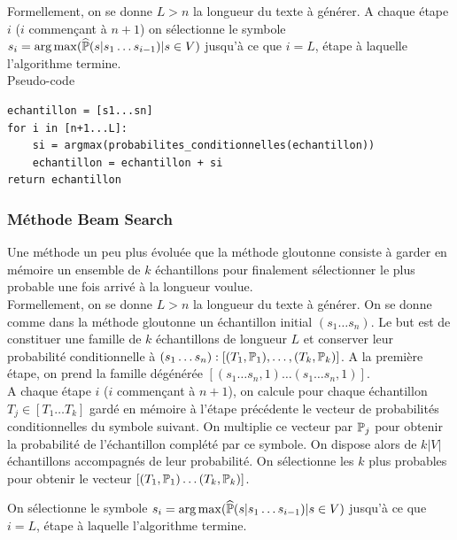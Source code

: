 Formellement, on se donne $L>n$ la longueur du texte à générer.
A chaque étape $i$ ($i$ commençant à $n+1$) on sélectionne le symbole
$s_i = \arg\max({\widehat{\P}(s|s_1\ldots s_{i-1}) | s \in V})$ jusqu'à ce que $i=L$,
étape à laquelle l'algorithme termine. \\

\noindent{} Pseudo-code

\begin{verbatim}
echantillon = [s1...sn]
for i in [n+1...L]:
    si = argmax(probabilites_conditionnelles(echantillon))
    echantillon = echantillon + si
return echantillon
\end{verbatim}


\subsubsection{Méthode Beam Search}
Une méthode un peu plus évoluée que la méthode gloutonne consiste à garder en mémoire un ensemble de $k$ échantillons pour finalement sélectionner le plus probable une fois arrivé à la longueur voulue. \\

Formellement, on se donne $L>n$ la longueur du texte à générer.
On se donne comme dans la méthode gloutonne un échantillon initial $(s_1\ldots s_n)$.
Le but est de constituer une famille de $k$ échantillons de longueur $L$ et conserver leur probabilité conditionnelle à $(s_1\ldots s_n) : [(T_1,\P_1),\ldots,(T_k,\P_k)]$.
A la première étape, on prend la famille dégénérée $[(s_1\ldots s_n, 1)\ldots (s_1\ldots s_n, 1)]$. \\

A chaque étape $i$ ($i$ commençant à $n+1$), on calcule pour chaque échantillon $T_j \in [T_1\ldots T_k]$ gardé en mémoire à l'étape précédente le vecteur de probabilités conditionnelles du symbole suivant. On multiplie ce vecteur par $\P_j$ pour obtenir la probabilité de l'échantillon complété par ce symbole.
On dispose alors de $k\vert V \vert$ échantillons accompagnés de leur probabilité. On sélectionne les $k$ plus probables pour obtenir le vecteur $[(T_1,\P_1)\ldots(T_k,\P_k)]$.

On sélectionne le symbole $s_i = \arg\max({\widehat{\P}(s|s_1\ldots s_{i-1}) | s \in V})$ jusqu'à ce que $i=L$, étape à laquelle l'algorithme termine. \\


